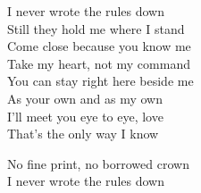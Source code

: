 \begin{lyrics}
I never wrote the rules down\\
Still they hold me where I stand\\
Come close because you know me\\
Take my heart, not my command\\
You can stay right here beside me\\
As your own and as my own\\
I’ll meet you eye to eye, love\\
That’s the only way I know

No fine print, no borrowed crown\\
I never wrote the rules down
\end{lyrics}

